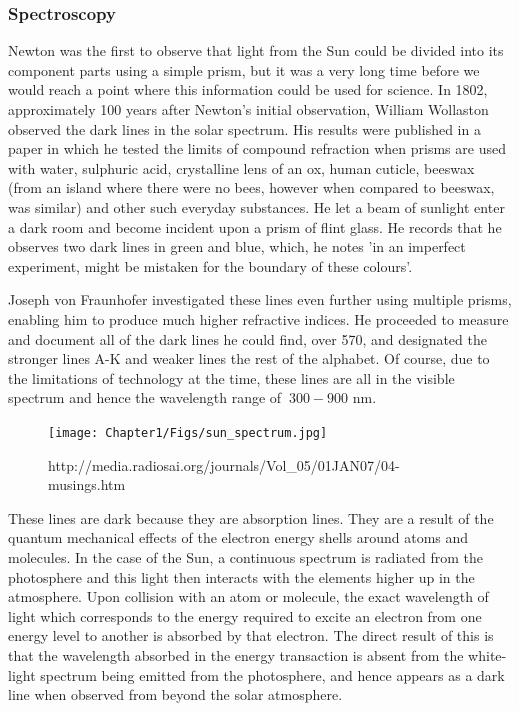 \subsubsection{Spectroscopy}

Newton was the first to observe that light from the Sun could be divided into its component parts using a simple prism, but it was a very long time before we would reach a point where this information could be used for science.
In 1802, approximately 100 years after Newton's initial observation, William Wollaston observed the dark lines in the solar spectrum.
His results were published in a paper in which he tested the limits of compound refraction when prisms are used with water, sulphuric acid, crystalline lens of an ox, human cuticle, beeswax (from an island where there were no bees, however when compared to beeswax, was similar) and other such everyday substances.
He let a beam of sunlight enter a dark room and become incident upon a prism of flint glass.
He records that he observes two dark lines in green and blue, which, he notes 'in an imperfect experiment, might be mistaken for the boundary of these colours'.

Joseph von Fraunhofer investigated these lines even further using multiple prisms, enabling him to produce much higher refractive indices. 
He proceeded to measure and document all of the dark lines he could find, over 570, and designated the stronger lines A-K and weaker lines the rest of the alphabet.
Of course, due to the limitations of technology at the time, these lines are all in the visible spectrum and hence the wavelength range of $~300 - 900$ nm.

\begin{figure}
	\texttt{[image: Chapter1/Figs/sun\_spectrum.jpg]}
	\label{fig:fraunhofer}
	\caption{http://media.radiosai.org/journals/Vol_05/01JAN07/04-musings.htm}
\end{figure}


These lines are dark because they are absorption lines.
They are a result of the quantum mechanical effects of the electron energy shells around atoms and molecules.
In the case of the Sun, a continuous spectrum is radiated from the photosphere and this light then interacts with the elements higher up in the atmosphere.
Upon collision with an atom or molecule, the exact wavelength of light which corresponds to the energy required to excite an electron from one energy level to another is absorbed by that electron.
The direct result of this is that the wavelength absorbed in the energy transaction is absent from the white-light spectrum being emitted from the photosphere, and hence appears as a dark line when observed from beyond the solar atmosphere. 

